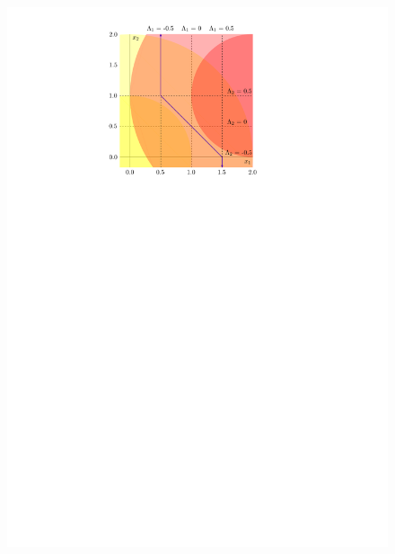 \begin{figure}[ht]
\begin{minipage}[t]{0.44\linewidth}
    \includegraphics[width=1\textwidth]{gauss_quant_rule}
  \end{minipage}
\end{figure}

